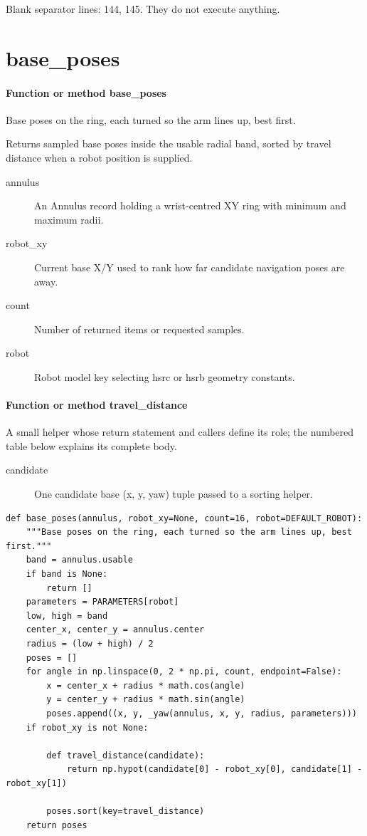 \documentclass[11pt,a4paper]{book}
\begin{document}
Blank separator lines: 144, 145. They do not execute anything.

\section{base\_poses}

\paragraph{Function or method base\_poses}
Base poses on the ring, each turned so the arm lines up, best first.

Returns sampled base poses inside the usable radial band, sorted by travel distance when a robot position is supplied.

\begin{description}
\item[annulus] An Annulus record holding a wrist-centred XY ring with minimum and maximum radii.
\item[robot\_xy] Current base X/Y used to rank how far candidate navigation poses are away.
\item[count] Number of returned items or requested samples.
\item[robot] Robot model key selecting hsrc or hsrb geometry constants.
\end{description}

\paragraph{Function or method travel\_distance}
A small helper whose return statement and callers define its role; the numbered table below explains its complete body.

\begin{description}
\item[candidate] One candidate base (x, y, yaw) tuple passed to a sorting helper.
\end{description}

\begin{lstlisting}[firstnumber=146]
def base_poses(annulus, robot_xy=None, count=16, robot=DEFAULT_ROBOT):
    """Base poses on the ring, each turned so the arm lines up, best first."""
    band = annulus.usable
    if band is None:
        return []
    parameters = PARAMETERS[robot]
    low, high = band
    center_x, center_y = annulus.center
    radius = (low + high) / 2
    poses = []
    for angle in np.linspace(0, 2 * np.pi, count, endpoint=False):
        x = center_x + radius * math.cos(angle)
        y = center_y + radius * math.sin(angle)
        poses.append((x, y, _yaw(annulus, x, y, radius, parameters)))
    if robot_xy is not None:

        def travel_distance(candidate):
            return np.hypot(candidate[0] - robot_xy[0], candidate[1] - robot_xy[1])

        poses.sort(key=travel_distance)
    return poses


\end{lstlisting}
\end{document}
